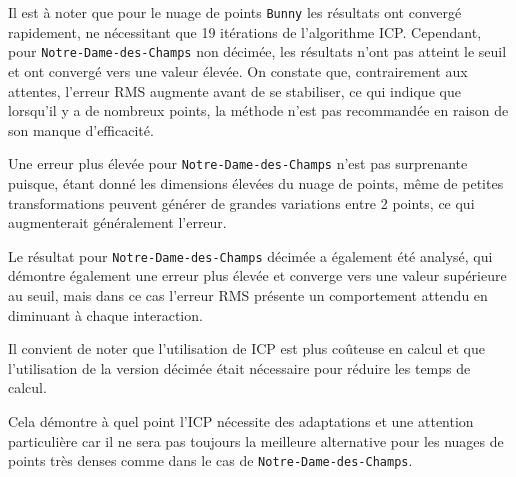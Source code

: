\documentclass[../5RO17_TP4.tex]{subfiles}
\begin{document}
\noindent Il est à noter que pour le nuage de points \texttt{Bunny} les résultats ont convergé rapidement, ne nécessitant que 19 itérations de l'algorithme ICP. Cependant, pour \texttt{Notre-Dame-des-Champs} non décimée, les résultats n'ont pas atteint le seuil et ont convergé vers une valeur élevée. On constate que, contrairement aux attentes, l’erreur RMS augmente avant de se stabiliser, ce qui indique que lorsqu’il y a de nombreux points, la méthode n’est pas recommandée en raison de son manque d’efficacité.

\begin{remark}
    Une erreur plus élevée pour \texttt{Notre-Dame-des-Champs} n'est pas surprenante puisque, étant donné les dimensions élevées du nuage de points, même de petites transformations peuvent générer de grandes variations entre 2 points, ce qui augmenterait généralement l'erreur.
\end{remark}

\noindent Le résultat pour \texttt{Notre-Dame-des-Champs} décimée a également été analysé, qui démontre également une erreur plus élevée et converge vers une valeur supérieure au seuil, mais dans ce cas l'erreur RMS présente un comportement attendu en diminuant à chaque interaction.

\begin{remark}
    Il convient de noter que l’utilisation de ICP est plus coûteuse en calcul et que l’utilisation de la version décimée était nécessaire pour réduire les temps de calcul.
\end{remark}

\noindent Cela démontre à quel point l'ICP nécessite des adaptations et une attention particulière car il ne sera pas toujours la meilleure alternative pour les nuages de points très denses comme dans le cas de \texttt{Notre-Dame-des-Champs}.
\end{document}

